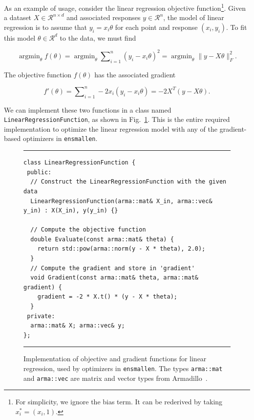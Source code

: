 \documentclass{article}
\DeclareMathOperator*{\argmindown}{argmin}   %
\begin{document}
As an example of usage, consider the linear regression objective
function\footnote{For simplicity, we ignore the bias term.  It can be
rederived by taking $x^*_i = (x_i, 1)$.}.  Given a dataset $X \in
\mathcal{R}^{n \times d}$ and associated responses $y \in \mathcal{R}^n$, the
model of linear regression is to assume that $y_i = x_i \theta$ for each
point and response $(x_i, y_i)$.  To fit this model $\theta \in \mathcal{R}^d$
to the data, we must find

\vspace*{-0.5em}
\begin{equation}
\argmindown_\theta f(\theta) =   %
\argmindown_\theta \sum\nolimits_{i = 1}^n (y_i - x_i \theta)^2 =
\argmindown_\theta \| y - X \theta \|_F^2.
\end{equation}
\vspace*{-0.5em}

The objective function $f(\theta)$ has the associated gradient

\vspace*{-0.5em}
\begin{equation}
f'(\theta) = \sum\nolimits_{i = 1}^n -2 x_i (y_i - x_i \theta) = -2 X^T (y - X \theta).
\end{equation}
\vspace*{-0.5em}

We can implement these two functions in a class named {\tt LinearRegressionFunction},
as shown in Fig.~\ref{fig:LinearRegressionFunction}.
This is the entire required implementation to optimize the linear regression model with
any of the gradient-based optimizers in {\tt ensmallen}.

\begin{figure}[!tb]
\hrule\vspace*{0.5ex}
\begin{adjustbox}{scale={0.95}{0.90}}
\begin{minipage}{\textwidth}
\begin{verbatim}
class LinearRegressionFunction {
 public:
  // Construct the LinearRegressionFunction with the given data
  LinearRegressionFunction(arma::mat& X_in, arma::vec& y_in) : X(X_in), y(y_in) {}

  // Compute the objective function
  double Evaluate(const arma::mat& theta) {
    return std::pow(arma::norm(y - X * theta), 2.0);
  }
  // Compute the gradient and store in 'gradient'
  void Gradient(const arma::mat& theta, arma::mat& gradient) {
    gradient = -2 * X.t() * (y - X * theta);
  }
 private:
  arma::mat& X; arma::vec& y;
};
\end{verbatim}
\end{minipage}
\end{adjustbox}
\vspace*{0.5ex}\hrule\vspace*{0.5ex}
\caption
  {
  Implementation of objective and gradient functions for linear regression,
  used by optimizers in \texttt{ensmallen}.
  The types {\footnotesize\tt arma::mat} and {\footnotesize\tt arma::vec}
  are matrix and vector types
  from Armadillo~\cite{sanderson2016armadillo}.
  }
\label{fig:LinearRegressionFunction}
\end{figure}
\end{document}
